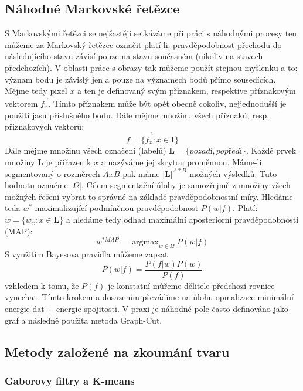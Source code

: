\documentclass{thesis}%
\DeclareMathOperator*{\argmax}{argmax}
\begin{document}
\subsection{Náhodné Markovské řetězce}
S Markovskými řetězci se nejšastěji setkáváme při práci s náhodnými procesy ten můžeme za Markovský řetězec označit platí-li: pravděpodobnost přechodu do následujícího stavu závisí pouze na stavu současném (nikoliv na stavech předchozích). V oblasti práce s obrazy tak můžeme použít stejnou myšlenku a to: význam bodu je závislý jen a pouze na významech bodů přímo sousedících. Mějme tedy pixel $x$ a ten je definovaný svým příznakem, respektive příznakovým vektorem $\overrightarrow{f_x}$. Tímto příznakem může být opět obecně cokoliv, nejjednodušší je použití jasu příslušného bodu. Dále mějme množinu všech příznaků, resp. přiznakových vektorů:
\begin{equation}
f = \{\overrightarrow{f_x} : x \in \mathbf{I}\}
\end{equation}
Dále mějme množinu všech označení (labelů) $\mathbf{L} = \{ pozadí, popředí\}$. Každé prvek množiny $\mathbf{L}$ je přiřazen k $x$ a nazýváme jej skrytou proměnnou. Máme-li segmentovaný o rozměrech $AxB$ pak máme $|\mathbf{L}|^{A*B}$ možných výsledků. Tuto hodnotu označme $|\Omega|$. Cílem segmentační úlohy je samozřejmě z množiny všech možných řešení vybrat to správné na základě pravděpodobnostní míry. Hledáme teda $w^*$ maximalizující podmíněnou pravděpodobnost $P(w|f)$. Platí: $w=\{ w_x : x \in \mathbf{L}\}$ a hledáme tedy odhad maximální aposteriorní pravděpodobnosti (MAP):
\begin{equation}
w^{*MAP} = \argmax_{w\in \Omega}P(w|f)
\end{equation}
S využitím Bayesova pravidla můžeme zapsat
\begin{equation}
P(w|f) = \frac{P(f|w)P(w)}{P(f)}
\end{equation}
vzhledem k tomu, že $P(f)$ je konstatní můřeme dělitele předchozí rovnice vynechat. Tímto krokem a dosazením převádíme na úlohu opmalizace minimální energie dat + energie spojitosti. V praxi je náhodné pole často definováno jako graf a následně použita metoda Graph-Cut.

\subsection{Metody založené na zkoumání tvaru}
\subsubsection{Gaborovy filtry a K-means}
\end{document}
